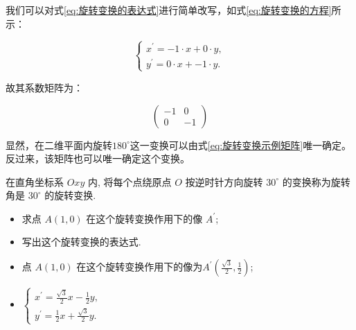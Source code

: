 我们可以对式\ref{eq:旋转变换的表达式}进行简单改写，如式\ref{eq:旋转变换的方程}所示：

\begin{equation}
\left\{\begin{array}{l}
x^{\prime}=-1 \cdot x + 0\cdot y, \\
y^{\prime}= 0\cdot x + -1 \cdot y .
\end{array}\right.
\label{eq:旋转变换的方程}
\end{equation}

故其系数矩阵为：

\begin{equation}
\left(\begin{array}{rr}
-1  & 0 \\
0  & -1
\end{array}\right)
\label{eq:旋转变换示例矩阵}
\end{equation}

显然，在二维平面内旋转$180^{\circ}$这一变换可以由式\ref{eq:旋转变换示例矩阵}唯一确定。反过来，该矩阵也可以唯一确定这个变换。

\begin{exercise}
 
在直角坐标系 $O x y$ 内, 将每个点绕原点 $O$ 按逆时针方向旋转 $30^{\circ}$ 的变换称为旋转角是 $30^{\circ}$ 的旋转变换.

\vspace{0.5cm}

\begin{itemize}
    \item 求点 $A(1,0)$ 在这个旋转变换作用下的像 $A^{\prime}$;
    \item 写出这个旋转变换的表达式.
\end{itemize}
\end{exercise}

\begin{solution}
\begin{itemize}
    \item 点 $A(1,0)$ 在这个旋转变换作用下的像为$A^{\prime}\left(\frac{\sqrt{3}}{2}, \frac{1}{2}\right)$;
    \item $\left\{\begin{array}{l}x^{\prime}=\frac{\sqrt{3}}{2} x-\frac{1}{2} y, \\ y^{\prime}=\frac{1}{2} x+\frac{\sqrt{3}}{2} y .\end{array}\right.$
\end{itemize}
\end{solution}

\vspace{0.5cm}

